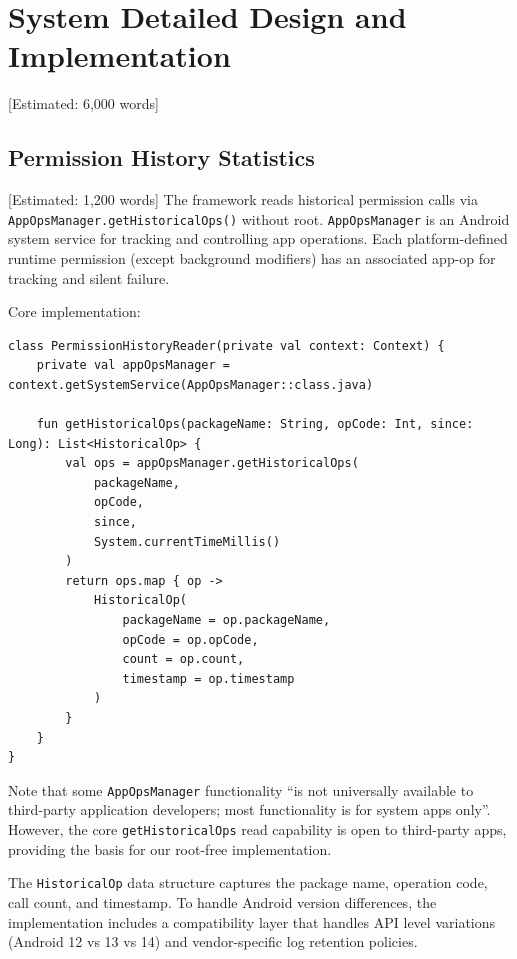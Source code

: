 \newpage\section{System Detailed Design and Implementation} [Estimated: 6,000 words]

\subsection{Permission History Statistics} [Estimated: 1,200 words]
The framework reads historical permission calls via \texttt{AppOpsManager.getHistoricalOps()} without root. \texttt{AppOpsManager} is an Android system service for tracking and controlling app operations. Each platform-defined runtime permission (except background modifiers) has an associated app-op for tracking and silent failure.

Core implementation:

\begin{lstlisting}[caption=Historical permission reading]
class PermissionHistoryReader(private val context: Context) {
    private val appOpsManager = context.getSystemService(AppOpsManager::class.java)
    
    fun getHistoricalOps(packageName: String, opCode: Int, since: Long): List<HistoricalOp> {
        val ops = appOpsManager.getHistoricalOps(
            packageName,
            opCode,
            since,
            System.currentTimeMillis()
        )
        return ops.map { op ->
            HistoricalOp(
                packageName = op.packageName,
                opCode = op.opCode,
                count = op.count,
                timestamp = op.timestamp
            )
        }
    }
}
\end{lstlisting}

Note that some \texttt{AppOpsManager} functionality ``is not universally available to third-party application developers; most functionality is for system apps only''. However, the core \texttt{getHistoricalOps} read capability is open to third-party apps, providing the basis for our root-free implementation.

The \texttt{HistoricalOp} data structure captures the package name, operation code, call count, and timestamp. To handle Android version differences, the implementation includes a compatibility layer that handles API level variations (Android 12 vs 13 vs 14) and vendor-specific log retention policies.

